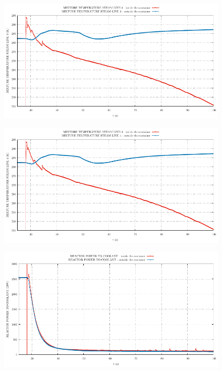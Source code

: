 \documentclass{article}
\begin{document}
\begin{multicols}{2}
\begin{figure}[H]
\end{figure}
\begin{figure}[H]
\centering
\includegraphics[width=\linewidth]{./graphs/MIXTURE TEMPERATURE STEAM LINE 3_comp.pdf}
\end{figure}
\begin{figure}[H]
\centering
\includegraphics[width=\linewidth]{./graphs/MIXTURE TEMPERATURE STEAM LINE 4_comp.pdf}
\end{figure}
\begin{figure}[H]
\centering
\includegraphics[width=\linewidth]{./graphs/REACTOR POWER TO COOLANT_comp.pdf}

\end{figure}
\end{multicols}
\end{document}
